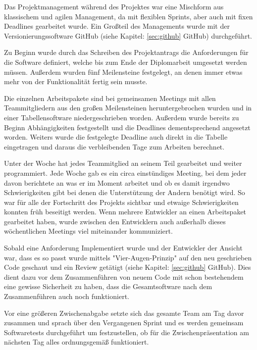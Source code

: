 \label{sec:ProManZELIA}

Das Projektmanagement während des Projektes war eine Mischform aus klassischem und agilen Management, da mit flexiblen Sprints, aber auch mit fixen Deadlines gearbeitet wurde. Ein Großteil des Managements wurde mit der Versionierungssoftware GitHub (siehe Kapitel: \ref{sec:github} GitHub) durchgeführt.

Zu Beginn wurde durch das Schreiben des Projektantrags die Anforderungen für die Software definiert, welche bis zum Ende der Diplomarbeit umgesetzt werden müssen. Außerdem wurden fünf Meilensteine festgelegt, an denen immer etwas mehr von der Funktionalität fertig sein musste.

Die einzelnen Arbeitspakete sind bei gemeinsamen Meetings mit allen Teammitgliedern aus den großen Meilensteinen heruntergebrochen wurden und in einer Tabellensoftware niedergeschrieben worden. Außerdem wurde bereits zu Beginn Abhängigkeiten festgestellt und die Deadlines dementsprechend angesetzt worden. Weiters wurde die festgelegte Deadline auch direkt in die Tabelle eingetragen und daraus die verbleibenden Tage zum Arbeiten berechnet.  

Unter der Woche hat jedes Teammitglied an seinem Teil gearbeitet und weiter programmiert. Jede Woche gab es ein circa einstündiges Meeting, bei dem jeder davon berichtete an was er im Moment arbeitet und ob es damit irgendwo Schwierigkeiten gibt bei denen die Unterstützung der Andern benötigt wird. So war für alle der Fortschritt des Projekts sichtbar und etwaige Schwierigkeiten konnten früh beseitigt werden. Wenn mehrere Entwickler an einen Arbeitspaket gearbeitet haben, wurde zwischen den Entwicklern auch außerhalb dieses wöchentlichen Meetings viel miteinander kommuniziert.

Sobald eine Anforderung Implementiert wurde und der Entwickler der Ansicht war, dass es so passt wurde mittels "Vier-Augen-Prinzip" auf den neu geschrieben Code geschaut und ein Review getätigt (siehe Kapitel: \ref{sec:github} GitHub). Dies dient dazu vor dem Zusammenführen von neuem Code mit schon bestehendem eine gewisse Sicherheit zu haben, dass die Gesamtsoftware nach dem Zusammenführen auch noch funktioniert.

Vor eine größeren Zwischenabgabe setzte sich das gesamte Team am Tag davor zusammen und sprach über den Vergangenen Sprint und es werden gemeinsam Softwaretests durchgeführt um festzustellen, ob für die Zwischenpräsentation am nächsten Tag alles ordnungsgemäß funktioniert. 
